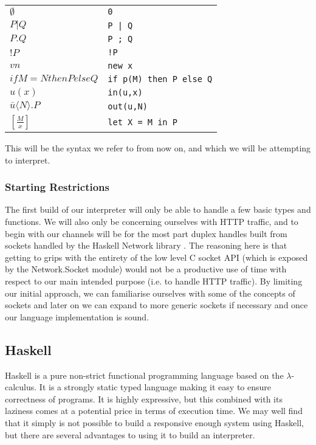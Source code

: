 \begin{table}[hc!]
    \begin{tabular}{l l}
        $\emptyset$&\verb!0!\\
        $P|Q$& \verb!P | Q!\\
        $P.Q$& \verb!P ; Q!\\
        $!P$ & \verb?!P?\\
        $vn$& \verb!new x!\\
        $if M=N then P else Q $&\verb!if p(M) then P else Q! \\
        $u(x)$&\verb!in(u,x)! \\
        $\bar{u}\langle N \rangle .P$&\verb!out(u,N)! \\
        $\left[ \frac{M}{x} \right]$&\verb!let X = M in P!\\
    \end{tabular}
\end{table} 

This will be the syntax we refer to from now on, and which we will be attempting to interpret.

\subsubsection{Starting Restrictions}

The first build of our interpreter will only be able to handle a few basic types and functions. We will also only be concerning ourselves with HTTP traffic, and to begin with our channels will be for the most part duplex handles built from sockets \cite{wiki:sockets} handled by the Haskell Network library \cite{hack:network}. The reasoning here is that getting to grips with the entirety of the low level C socket API (which is exposed by the Network.Socket module) would not be a productive use of time with respect to our main intended purpose (i.e. to handle HTTP traffic).
By limiting our initial approach, we can familiarise ourselves with some of the concepts of
sockets and later on we can expand to more generic sockets if necessary and once our language implementation is sound.

\subsection{Haskell}

Haskell is a pure non-strict functional programming language based on the $\lambda$-calculus. It is a strongly static typed language making it easy to ensure correctness of programs. It is highly expressive, but this combined with its laziness comes at a potential price in terms of execution time. We may well find that it simply is not possible to build a responsive enough system using Haskell, but there are several advantages to using it to build an interpreter.

